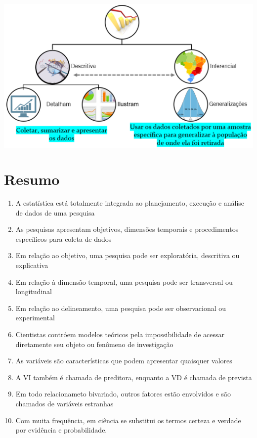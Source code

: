 \documentclass[
]{book}
\providecommand{\tightlist}{%
  \setlength{\itemsep}{0pt}\setlength{\parskip}{0pt}}
\begin{document}
\includegraphics{./img/cap_areas_estatistica.png}

\hypertarget{resumo-1}{%
\section{Resumo}\label{resumo-1}}

\begin{explore}

\begin{enumerate}
\def\labelenumi{\arabic{enumi}.}
\tightlist
\item
  A estatística está totalmente integrada ao planejamento, execução e
  análise de dados de uma pesquisa\\
\item
  As pesquisas apresentam objetivos, dimensões temporais e procedimentos
  específicos para coleta de dados\\
\item
  Em relação ao objetivo, uma pesquisa pode ser exploratória, descritiva
  ou explicativa\\
\item
  Em relação à dimensão temporal, uma pesquisa pode ser transversal ou
  longitudinal\\
\item
  Em relação ao delineamento, uma pesquisa pode ser observacional ou
  experimental\\
\item
  Cientistas contróem modelos teóricos pela impossibilidade de acessar
  diretamente seu objeto ou fenômeno de investigação\\
\item
  As variáveis são características que podem apresentar quaisquer
  valores\\
\item
  A VI também é chamada de preditora, enquanto a VD é chamada de
  prevista\\
\item
  Em todo relacionameto bivariado, outros fatores estão envolvidos e são
  chamados de variáveis estranhas\\
\item
  Com muita frequência, em ciência se substitui os termos certeza e
  verdade por evidência e probabilidade.
\end{enumerate}

\end{explore}
\end{document}

